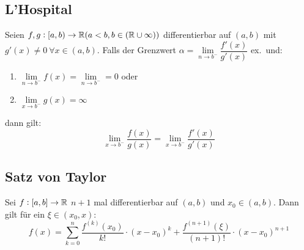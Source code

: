 \subsection{L'Hospital}
Seien $f,g: [a,b) \rightarrow \mathbb{R} (a < b, b \in (\mathbb{R} \cup {\infty}))$
differentierbar auf $(a,b)$ mit $g'(x) \neq 0\ \forall x \in (a,b)$. Falls
der Grenzwert $\alpha = \lim\limits_{n \rightarrow b^-} \dfrac{f'(x)}{g'(x)}$
ex.\ und:
\begin{enumerate}[label= (\alph*)]
    \item $\lim\limits_{n \rightarrow b^-} f(x) =
        \lim\limits_{n \rightarrow b^-} = 0$ oder
    \item $\lim\limits_{x \rightarrow b^-} g(x) = \infty$
\end{enumerate}
dann gilt:
\begin{equation*}
    \lim_{x \rightarrow b^-} \frac{f(x)}{g(x)} =
    \lim_{x \rightarrow b^-} \frac{f'(x)}{g'(x)}
\end{equation*}

\subsection{Satz von Taylor}
Sei $f: [a,b] \rightarrow \mathbb{R}$ $n+1$ mal differentierbar auf $(a,b)$ und
$x_0 \in (a,b)$. Dann gilt für ein $\xi \in (x_0, x)$:
\begin{equation*}
    f(x) = \sum_{k=0}^n \frac{f^(k)(x_0)}{k!} \cdot {(x-x_0)}^k +
    \frac{f^{(n+1)}(\xi)}{(n+1)!} \cdot {(x-x_0)}^{n+1}
\end{equation*}
